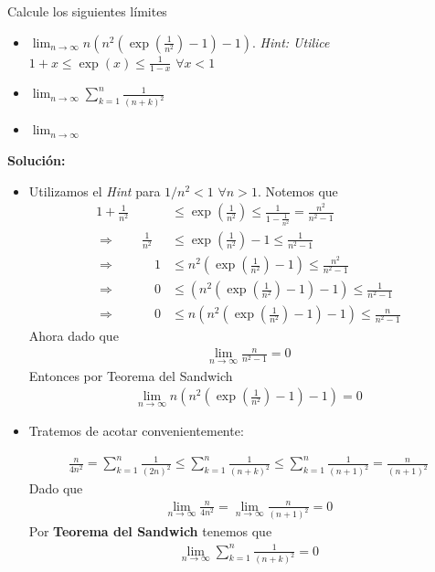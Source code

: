 \documentclass[12pt]{book}
\begin{document}
\begin{prob}{}{}
    Calcule los siguientes límites
    \begin{itemize}
        \item[\textbf{a)}] $\displaystyle \lim_{n \to \infty} n \left(n^2 \left(\exp\left(\frac{1}{n^2}\right)  -1\right)-1\right)$. \quad \emph{Hint: Utilice $1+x \leq \exp(x) \leq \frac{1}{1-x}$} $\forall x<1$
        \item[\textbf{b)}] $\displaystyle \lim_{n \to \infty} \sum_{k=1}^n  \frac{1}{\left(n+k\right)^2}$
        \item[\textbf{c)}] $\displaystyle \lim_{n \to \infty} \frac{}{}$
    \end{itemize}
\end{prob}
\textbf{Solución:}
\begin{itemize}
    \item[\textbf{a)}] Utilizamos el \emph{Hint} para $1/n^2 <1$ $\forall n >1$. Notemos que 
    \begin{align*}
        1+\frac{1}{n^2}&\leq \exp\left(\frac{1}{n^2} \right) \leq \frac{1}{1-\frac{1}{n^2}}=\frac{n^2}{n^2-1}  \\
        \Longrightarrow \quad \quad \frac{1}{n^2} &\leq \exp\left(\frac{1}{n^2}\right)  -1 \leq \frac{1}{n^2-1} \\
  \Longrightarrow \quad \quad \quad 1&\leq  n^2 \left(\exp\left(\frac{1}{n^2}\right)  -1\right) \leq \frac{n^2}{n^2-1} \\
\Longrightarrow \quad \quad \quad 0 &\leq \left(n^2 \left(\exp\left(\frac{1}{n^2}\right)  -1\right)-1\right) \leq \frac{1}{n^2-1} \\
\Longrightarrow \quad \quad \quad 0 &\leq n \left(n^2 \left(\exp\left(\frac{1}{n^2}\right)  -1\right)-1\right) \leq \frac{n}{n^2-1}
    \end{align*}
Ahora dado que 
\begin{align*}
    \lim_{n \to \infty} \frac{n}{n^2-1} = 0
\end{align*}
Entonces por Teorema del Sandwich
\begin{align*}
    \lim_{n \to \infty} n \left(n^2 \left(\exp\left(\frac{1}{n^2}\right)  -1\right)-1\right) =0
\end{align*}

\item[\textbf{b)}] Tratemos de acotar convenientemente:

\begin{align*}
    \frac{n}{4n^2}=\sum_{k=1}^n \frac{1}{(2n)^2}\leq \sum_{k=1}^n \frac{1}{(n+k)^2}\leq \sum_{k=1}^n \frac{1}{(n+1)^2}=\frac{n}{(n+1)^2}
 \end{align*}
Dado que 
\begin{align*}
    \lim_{n \to \infty} \frac{n}{4n^2}= \lim_{n \to \infty} \frac{n}{(n+1)^2}=0
\end{align*}
Por \textbf{Teorema del Sandwich} tenemos que 
\begin{align*}
    \lim_{n \to \infty}  \sum_{k=1}^n  \frac{1}{\left(n+k\right)^2}=0
\end{align*}

\end{itemize}
\end{document}
